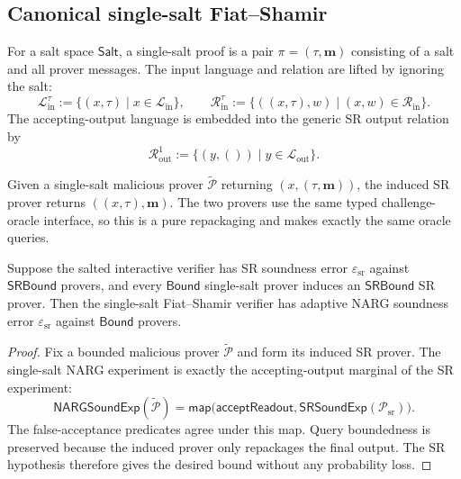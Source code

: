 \subsection{Canonical single-salt Fiat--Shamir}

For a salt space $\mathsf{Salt}$, a single-salt proof is a pair
$\pi=(\tau,\mathbf m)$ consisting of a salt and all prover messages.  The input language and
relation are lifted by ignoring the salt:
\[
  \mathcal L_{\mathrm{in}}^{\tau}
    := \{(x,\tau)\mid x\in\mathcal L_{\mathrm{in}}\},\qquad
  \mathcal R_{\mathrm{in}}^{\tau}
    := \{((x,\tau),w)\mid(x,w)\in\mathcal R_{\mathrm{in}}\}.
\]
The accepting-output language is embedded into the generic SR output relation by
\[
  \mathcal R_{\mathrm{out}}^{1}
    := \{(y,())\mid y\in\mathcal L_{\mathrm{out}}\}.
\]

\begin{definition}
  \label{def:single_salt_induced_sr_prover}
  Given a single-salt malicious prover
  $\widetilde{\mathcal P}$ returning $(x,(\tau,\mathbf m))$, the induced SR prover returns
  $((x,\tau),\mathbf m)$.  The two provers use the same typed challenge-oracle interface, so this
  is a pure repackaging and makes exactly the same oracle queries.
  \leanok
\end{definition}

\begin{theorem}
  \label{thm:single_salt_fiat_shamir_soundness}
  Suppose the salted interactive verifier has SR soundness error
  $\varepsilon_{\mathrm{sr}}$ against $\mathsf{SRBound}$ provers, and every
  $\mathsf{Bound}$ single-salt prover induces an $\mathsf{SRBound}$ SR prover.  Then the
  single-salt Fiat--Shamir verifier has adaptive NARG soundness error
  $\varepsilon_{\mathrm{sr}}$ against $\mathsf{Bound}$ provers.
  \leanok
\end{theorem}

\begin{proof}
  Fix a bounded malicious prover $\widetilde{\mathcal P}$ and form its induced SR prover.  The
  single-salt NARG experiment is exactly the accepting-output marginal of the SR experiment:
  \[
    \mathsf{NARGSoundExp}(\widetilde{\mathcal P})
      = \mathsf{map}\bigl(\mathsf{acceptReadout},
          \mathsf{SRSoundExp}(\mathcal P_{\mathrm{sr}})\bigr).
  \]
  The false-acceptance predicates agree under this map.  Query boundedness is preserved because
  the induced prover only repackages the final output.  The SR hypothesis therefore gives the
  desired bound without any probability loss.
  \leanok
\end{proof}

